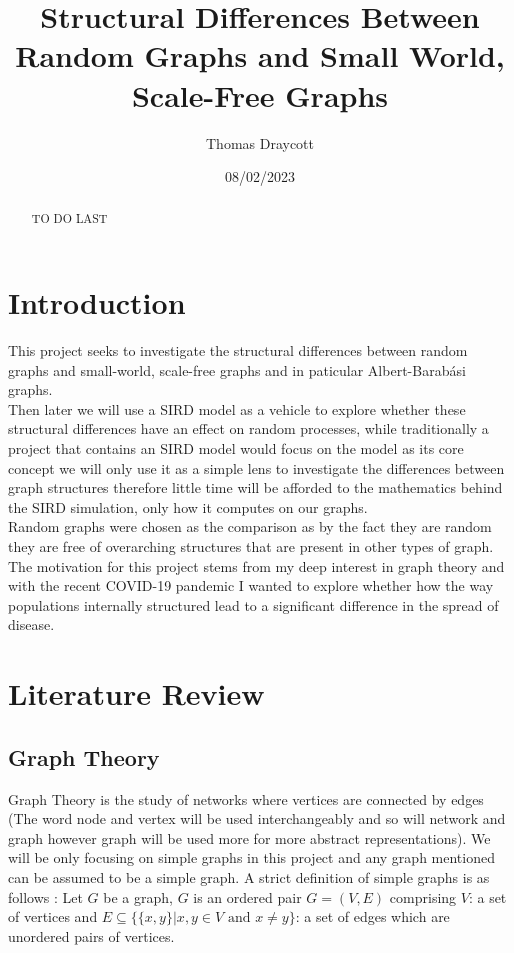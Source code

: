 \documentclass{article}
\title{Structural Differences Between Random Graphs and Small World, Scale-Free Graphs }
\date{08/02/2023}
\author{Thomas Draycott}
\begin{document}
    \maketitle
    \newpage
    \tableofcontents
    \newpage
    \begin{abstract}
        TO DO LAST
    \end{abstract}
    \section{Introduction}
    This project seeks to investigate the structural differences between random graphs and small-world, scale-free graphs and in paticular Albert-Barabási graphs.\\
    Then later we will use a SIRD model as a vehicle to explore whether these structural differences have an effect on random processes,  while traditionally a project that contains an SIRD model would focus on the model as its core concept we will only use it as a simple lens to investigate the differences between graph structures therefore little time will be afforded to the mathematics behind the SIRD simulation, only how it computes on our graphs.\\
    Random graphs were chosen as the comparison as by the fact they are random they are free of overarching structures that are present in other types of graph.\\
    The motivation for this project stems from my deep interest in graph theory and with the recent COVID-19 pandemic I wanted to explore whether how the way populations internally structured lead to a significant difference in the spread of disease.
    \section{Literature Review}
        \subsection{Graph Theory}
        Graph Theory is the study of networks where vertices are connected by edges (The word node and vertex will be used interchangeably and so will network and graph however graph will be used more for more abstract representations). We will be only focusing on simple graphs in this project and any graph mentioned can be assumed to be a simple graph. A strict definition of simple graphs is as follows \parencite{bender2010lists}: Let $G$ be a graph, $G$ is an ordered pair $G=(V,E)$ comprising $V$: a set of vertices and $E\subseteq \{\{x,y\} | x,y \in V \text{ and } x\neq y\}$: a set of edges which are unordered pairs of vertices.
\end{document}
